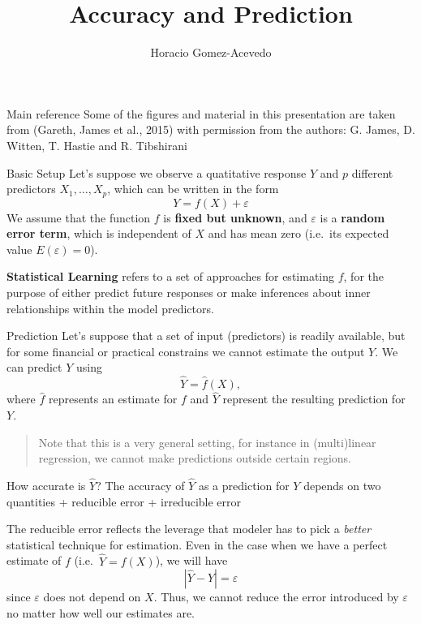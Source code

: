 \documentclass[
  ignorenonframetext,
]{beamer}
\title{Accuracy and Prediction}
\author{Horacio Gomez-Acevedo}
\date{}
\begin{document}
\frame{\titlepage}


\begin{frame}{Main reference}
\label{main-reference}
Some of the figures and material in this presentation are taken from
(Gareth, James et al., 2015) with permission from the authors: G. James,
D. Witten, T. Hastie and R. Tibshirani
\end{frame}

\begin{frame}{Basic Setup}
\label{basic-setup}
Let's suppose we observe a quatitative response \(Y\) and \(p\)
different predictors \(X_1,\ldots, X_p\), which can be written in the
form \[
Y= f(X) + \varepsilon
\] We assume that the function \(f\) is \textbf{fixed but unknown}, and
\(\varepsilon\) is a \textbf{random error term}, which is independent of
\(X\) and has mean zero (i.e.~its expected value
\(E (\varepsilon) =0\)).

\textbf{Statistical Learning} refers to a set of approaches for
estimating \(f\), for the purpose of either predict future responses or
make inferences about inner relationships within the model predictors.

\begin{block}{Prediction}
\label{prediction}
Let's suppose that a set of input (predictors) is readily available, but
for some financial or practical constrains we cannot estimate the output
\(Y\). We can predict \(Y\) using \[
    \hat{Y} = \hat{f}(X),
\] where \(\hat{f}\) represents an estimate for \(f\) and \(\hat{Y}\)
represent the resulting prediction for \(Y\).

\begin{quote}
Note that this is a very general setting, for instance in (multi)linear
regression, we cannot make predictions outside certain regions.
\end{quote}

\begin{block}{How accurate is \(\hat{Y}\)?}
\label{how-accurate-is-haty}
The accuracy of \(\hat{Y}\) as a prediction for \(Y\) depends on two
quantities + reducible error + irreducible error

The reducible error reflects the leverage that modeler has to pick a
\emph{better} statistical technique for estimation. Even in the case
when we have a perfect estimate of \(f\) (i.e.~\(\hat{Y}=f(X)\)), we
will have \[
|\hat{Y}-Y| = \varepsilon
\] since \(\varepsilon\) does not depend on \(X\). Thus, we cannot
reduce the error introduced by \(\varepsilon\) no matter how well our
estimates are.


\end{block}
\end{block}
\end{frame}
\end{document}
